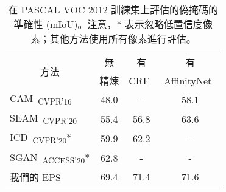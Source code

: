 \begin{table}[]
\centering
{\small
\begin{tabular}{@{}lccc@{}}
\toprule
\multicolumn{1}{c}{\multirow{2}{*}{方法}}         & 無           & 有 &                                  有 \\
                                                    & 精煉    & CRF~\cite{krahenbuhl2011efficient}    & AffinityNet~\cite{ahn2018learning}    \\ \midrule
\multicolumn{1}{l}{CAM~\cite{zhou2016learning}\textsubscript{CVPR'16}}     & 48.0          & -                                     & 58.1                                  \\
\multicolumn{1}{l}{SEAM~\cite{wang2020self}\textsubscript{CVPR'20}}        & 55.4          & 56.8                                  & 63.6                                  \\
\multicolumn{1}{l}{ICD~\cite{chen2020boundary}\textsubscript{CVPR'20}*}     & 59.9          & 62.2                                  & -                                     \\
\multicolumn{1}{l}{SGAN~\cite{yao2020saliency}\textsubscript{ACCESS'20}*}     & 62.8          & -                                     & -                                     \\
\multicolumn{1}{l}{我們的 EPS}                            & 69.4          & 71.4                                  & 71.6                                  \\ \bottomrule
\end{tabular}
}
\vspace{2mm}
\caption{在 PASCAL VOC 2012 訓練集上評估的偽掩碼的準確性 (mIoU)。注意，* 表示忽略低置信度像素；其他方法使用所有像素進行評估。} \vspace{-3mm}
\label{tab:refinement}
\end{table}
